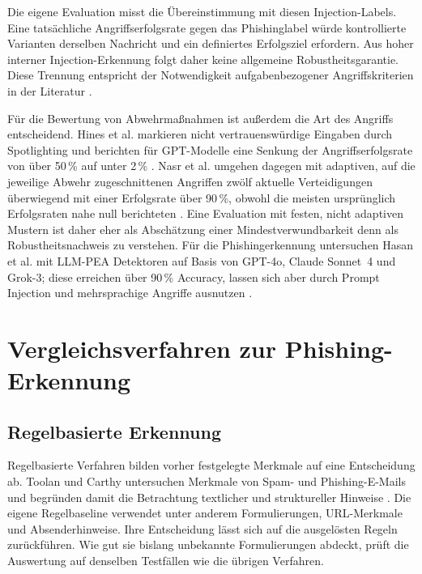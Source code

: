 \documentclass[12pt,twoside=false,a4paper,parskip]{scrbook}
\begin{document}
Die eigene Evaluation misst die Übereinstimmung mit diesen Injection-Labels. Eine tatsächliche Angriffserfolgsrate gegen das Phishinglabel würde kontrollierte Varianten derselben Nachricht und ein definiertes Erfolgsziel erfordern. Aus hoher interner Injection-Erkennung folgt daher keine allgemeine Robustheitsgarantie. Diese Trennung entspricht der Notwendigkeit aufgabenbezogener Angriffskriterien in der Literatur \cite{liu2024formalizing,duarte2026systematic}.

Für die Bewertung von Abwehrmaßnahmen ist außerdem die Art des Angriffs entscheidend. Hines et al. markieren nicht vertrauenswürdige Eingaben durch Spotlighting und berichten für GPT-Modelle eine Senkung der Angriffserfolgsrate von über 50\,\% auf unter 2\,\% \cite{hines2024spotlighting}. Nasr et al. umgehen dagegen mit adaptiven, auf die jeweilige Abwehr zugeschnittenen Angriffen zwölf aktuelle Verteidigungen überwiegend mit einer Erfolgsrate über 90\,\%, obwohl die meisten ursprünglich Erfolgsraten nahe null berichteten \cite{nasr2025attacker}. Eine Evaluation mit festen, nicht adaptiven Mustern ist daher eher als Abschätzung einer Mindestverwundbarkeit denn als Robustheitsnachweis zu verstehen. Für die Phishingerkennung untersuchen Hasan et al. mit LLM-PEA Detektoren auf Basis von GPT-4o, Claude Sonnet~4 und Grok-3; diese erreichen über 90\,\% Accuracy, lassen sich aber durch Prompt Injection und mehrsprachige Angriffe ausnutzen \cite{hasan2025phishing}.

\section{Vergleichsverfahren zur Phishing-Erkennung}\label{sec:erkennungsansaetze}

\subsection{Regelbasierte Erkennung}

Regelbasierte Verfahren bilden vorher festgelegte Merkmale auf eine Entscheidung ab. Toolan und Carthy untersuchen Merkmale von Spam- und Phishing-E-Mails und begründen damit die Betrachtung textlicher und struktureller Hinweise \cite{toolan2010feature}. Die eigene Regelbaseline verwendet unter anderem Formulierungen, URL-Merkmale und Absenderhinweise. Ihre Entscheidung lässt sich auf die ausgelösten Regeln zurückführen. Wie gut sie bislang unbekannte Formulierungen abdeckt, prüft die Auswertung auf denselben Testfällen wie die übrigen Verfahren.
\end{document}
